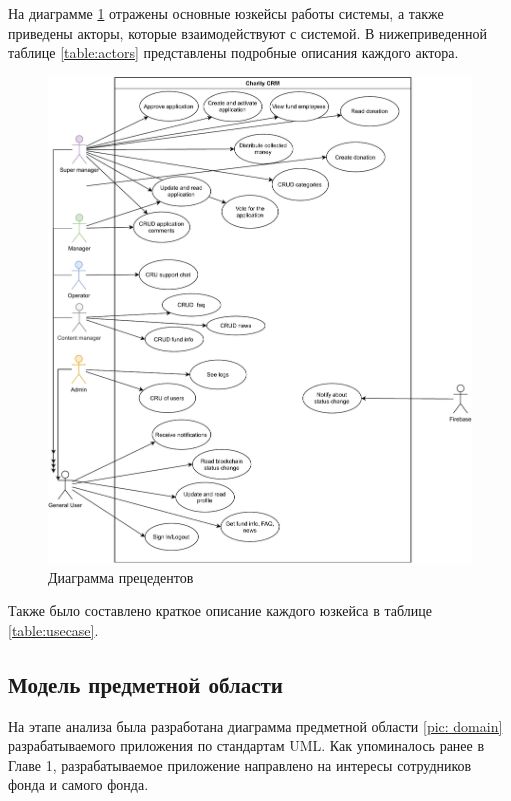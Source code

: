 \documentclass[a4paper,12pt,reqno]{article}
\begin{document}
На диаграмме \ref{pic: usecase} отражены основные юзкейсы работы системы, а также приведены акторы, которые взаимодействуют с системой. В нижеприведенной таблице \ref{table:actors} представлены подробные описания каждого актора.



\begin{figure}[H]
		\centering
		\includegraphics[width = 0.9\linewidth]{img/usecase.pdf}
		\caption{Диаграмма прецедентов}
		\label{pic: usecase}
\end{figure}




Также было составлено краткое описание каждого юзкейса в таблице \ref{table:usecase}.



\subsection{Модель предметной области} \label{sec: application}

На этапе анализа была разработана диаграмма предметной  области \ref{pic: domain} разрабатываемого приложения по стандартам UML\cite{uml}. Как упоминалось ранее в Главе 1, разрабатываемое приложение направлено на интересы сотрудников фонда и самого фонда. 
\end{document}
